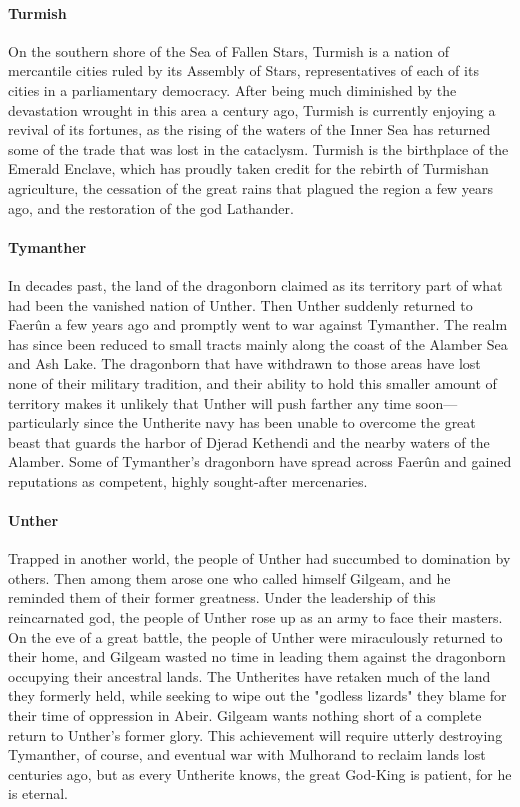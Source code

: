 \documentclass[10pt,a4paper,twoside,twocolumn,openany,bg=print,nodeprecatedcode]{dndbook}
\begin{document}
\paragraph{Turmish}
On the southern shore of the Sea of Fallen Stars, Turmish is a nation of mercantile cities ruled by its Assembly of Stars, representatives of each of its cities in a parliamentary democracy. After being much diminished by the devastation wrought in this area a century ago, Turmish is currently enjoying a revival of its fortunes, as the rising of the waters of the Inner Sea has returned some of the trade that was lost in the cataclysm. Turmish is the birthplace of the Emerald Enclave, which has proudly taken credit for the rebirth of Turmishan agriculture, the cessation of the great rains that plagued the region a few years ago, and the restoration of the god Lathander.
\paragraph{Tymanther}
In decades past, the land of the dragonborn claimed as its territory part of what had been the vanished nation of Unther. Then Unther suddenly returned to Faerûn a few years ago and promptly went to war against Tymanther. The realm has since been reduced to small tracts mainly along the coast of the Alamber Sea and Ash Lake. The dragonborn that have withdrawn to those areas have lost none of their military tradition, and their ability to hold this smaller amount of territory makes it unlikely that Unther will push farther any time soon—particularly since the Untherite navy has been unable to overcome the great beast that guards the harbor of Djerad Kethendi and the nearby waters of the Alamber.
Some of Tymanther's dragonborn have spread across Faerûn and gained reputations as competent, highly sought-after mercenaries.
\paragraph{Unther}
Trapped in another world, the people of Unther had succumbed to domination by others. Then among them arose one who called himself Gilgeam, and he reminded them of their former greatness. Under the leadership of this reincarnated god, the people of Unther rose up as an army to face their masters. On the eve of a great battle, the people of Unther were miraculously returned to their home, and Gilgeam wasted no time in leading them against the dragonborn occupying their ancestral lands. The Untherites have retaken much of the land they formerly held, while seeking to wipe out the "godless lizards" they blame for their time of oppression in Abeir.
Gilgeam wants nothing short of a complete return to Unther's former glory. This achievement will require utterly destroying Tymanther, of course, and eventual war with Mulhorand to reclaim lands lost centuries ago, but as every Untherite knows, the great God-King is patient, for he is eternal.
\end{document}

